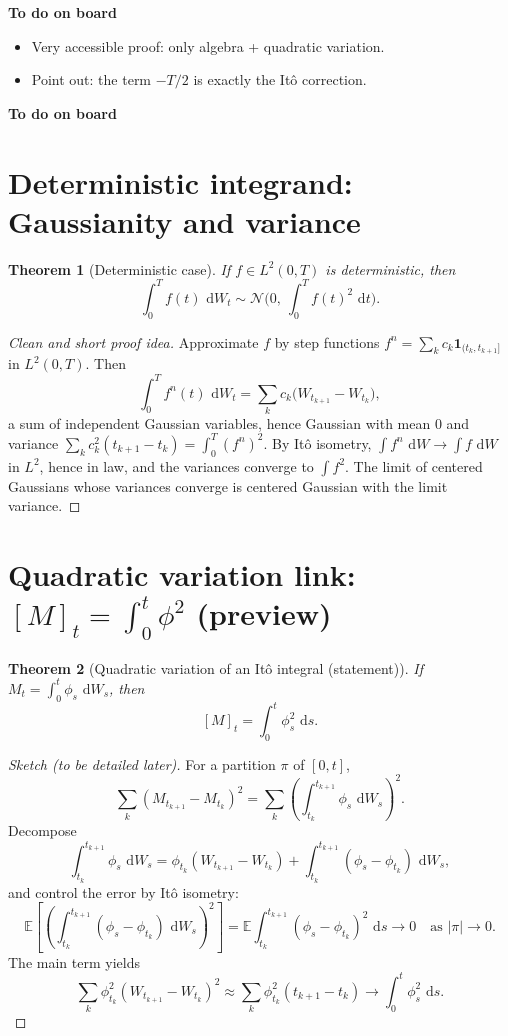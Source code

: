 \documentclass[11pt]{article}
\newcommand{\E}{\mathbb{E}}
\newcommand{\1}{\mathbf{1}}
\newcommand{\dd}{\,\mathrm{d}}
\numberwithin{equation}{section}
\theoremstyle{plain}
\newtheorem{theorem}{Theorem}[section]
\theoremstyle{definition}
\theoremstyle{remark}
\begin{document}
\textbf{To do on board}
\begin{itemize}
  \item Very accessible proof: only algebra + quadratic variation.
  \item Point out: the term $-T/2$ is exactly the It\^o correction.
\end{itemize}
\textbf{To do on board}

\section{Deterministic integrand: Gaussianity and variance}

\begin{theorem}[Deterministic case]
If $f\in L^2(0,T)$ is deterministic, then
\[
\int_0^T f(t)\,\dd W_t \sim \mathcal N\!\Big(0,\ \int_0^T f(t)^2\,\dd t\Big).
\]
\end{theorem}

\begin{proof}[Clean and short proof idea]
Approximate $f$ by step functions $f^n=\sum_k c_k\1_{(t_k,t_{k+1}]}$ in $L^2(0,T)$.
Then
\[
\int_0^T f^n(t)\,\dd W_t=\sum_k c_k\big(W_{t_{k+1}}-W_{t_k}\big),
\]
a sum of independent Gaussian variables, hence Gaussian with mean $0$ and variance
$\sum_k c_k^2(t_{k+1}-t_k)=\int_0^T (f^n)^2$.
By It\^o isometry, $\int f^n\,\dd W\to \int f\,\dd W$ in $L^2$, hence in law, and the variances converge to $\int f^2$.
The limit of centered Gaussians whose variances converge is centered Gaussian with the limit variance.
\end{proof}

\section{Quadratic variation link: $[M]_t=\int_0^t \phi^2$ (preview)}

\begin{theorem}[Quadratic variation of an It\^o integral (statement)]
If $M_t=\int_0^t \phi_s\,\dd W_s$, then
\[
[M]_t=\int_0^t \phi_s^2\,\dd s.
\]
\end{theorem}

\begin{proof}[Sketch (to be detailed later)]
For a partition $\pi$ of $[0,t]$,
\[
\sum_k (M_{t_{k+1}}-M_{t_k})^2
=\sum_k \left(\int_{t_k}^{t_{k+1}}\phi_s\,\dd W_s\right)^2.
\]
Decompose
\[
\int_{t_k}^{t_{k+1}}\phi_s\,\dd W_s
=\phi_{t_k}(W_{t_{k+1}}-W_{t_k})+\int_{t_k}^{t_{k+1}}(\phi_s-\phi_{t_k})\,\dd W_s,
\]
and control the error by It\^o isometry:
\[
\E\left[\left(\int_{t_k}^{t_{k+1}}(\phi_s-\phi_{t_k})\,\dd W_s\right)^2\right]
=\E\int_{t_k}^{t_{k+1}}(\phi_s-\phi_{t_k})^2\,\dd s \to 0
\quad\text{as }|\pi|\to 0.
\]
The main term yields
\[
\sum_k \phi_{t_k}^2 (W_{t_{k+1}}-W_{t_k})^2 \approx \sum_k \phi_{t_k}^2 (t_{k+1}-t_k)
\to \int_0^t \phi_s^2\,\dd s.
\]
\end{proof}
\end{document}

